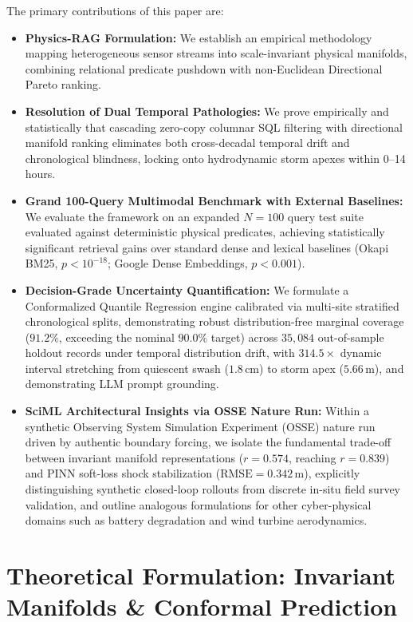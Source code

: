 \documentclass[journal]{IEEEtran}
\begin{document}
The primary contributions of this paper are:
\begin{itemize}
    \item \textbf{Physics-RAG Formulation:} We establish an empirical methodology mapping heterogeneous sensor streams into scale-invariant physical manifolds, combining relational predicate pushdown with non-Euclidean Directional Pareto ranking.
    \item \textbf{Resolution of Dual Temporal Pathologies:} We prove empirically and statistically that cascading zero-copy columnar SQL filtering with directional manifold ranking eliminates both cross-decadal temporal drift and chronological blindness, locking onto hydrodynamic storm apexes within 0--14 hours.
    \item \textbf{Grand 100-Query Multimodal Benchmark with External Baselines:} We evaluate the framework on an expanded $N = 100$ query test suite evaluated against deterministic physical predicates, achieving statistically significant retrieval gains over standard dense and lexical baselines (Okapi BM25, $p < 10^{-18}$; Google Dense Embeddings, $p < 0.001$).
    \item \textbf{Decision-Grade Uncertainty Quantification:} We formulate a Conformalized Quantile Regression engine calibrated via multi-site stratified chronological splits, demonstrating robust distribution-free marginal coverage ($91.2\%$, exceeding the nominal $90.0\%$ target) across $35{,}084$ out-of-sample holdout records under temporal distribution drift, with $314.5\times$ dynamic interval stretching from quiescent swash ($1.8\,\text{cm}$) to storm apex ($5.66\,\text{m}$), and demonstrating LLM prompt grounding.
    \item \textbf{SciML Architectural Insights via OSSE Nature Run:} Within a synthetic Observing System Simulation Experiment (OSSE) nature run driven by authentic boundary forcing, we isolate the fundamental trade-off between invariant manifold representations ($r = 0.574$, reaching $r = 0.839$) and PINN soft-loss shock stabilization ($\text{RMSE} = 0.342\,\text{m}$), explicitly distinguishing synthetic closed-loop rollouts from discrete in-situ field survey validation, and outline analogous formulations for other cyber-physical domains such as battery degradation and wind turbine aerodynamics.
\end{itemize}

\section{Theoretical Formulation: Invariant Manifolds \& Conformal Prediction}
\end{document}
